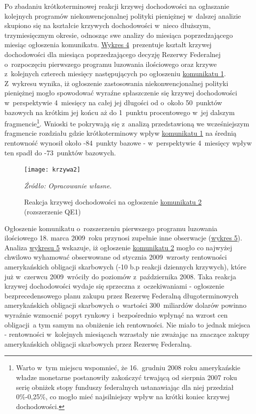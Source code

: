 Po zbadaniu krótkoterminowej reakcji krzywej dochodowości na ogłaszanie kolejnych programów niekonwencjonalnej polityki pieniężnej w~dalszej analizie skupiono się na kształcie krzywych dochodowości w~nieco dłuższym, trzymiesięcznym okresie, odnosząc swe analizy do miesiąca poprzedzającego miesiąc ogłoszenia komunikatu. \hyperlink{fig4}{Wykres 4}~prezentuje kształt krzywej dochodowości dla miesiąca poprzedzającego decyzję Rezerwy Federalnej o~rozpoczęciu pierwszego programu luzowania ilościowego oraz krzywe z~kolejnych czterech miesięcy następujących po ogłoszeniu \hyperlink{kom1}{komunikatu 1}. Z~wykresu wynika, iż ogłoszenie zastosowania niekonwencjonalnej polityki pieniężnej mogło spowodować wyraźne spłaszczenie się krzywej dochodowości w~perspektywie 4~miesięcy na całej jej długości od o~około 50~punktów bazowych na krótkim jej końcu aż do 1~punktu procentowego w~jej dalszym fragmencie\footnote{Warto w~tym miejscu wspomnieć, że 16.~grudniu 2008 roku amerykańskie władze monetarne postanowiły zakończyć trwającą od sierpnia 2007 roku serię obniżek stopy funduszy federalnych ustanawiając dla niej przedział 0\%-0,25\%, co mogło mieć najsilniejszy wpływ na krótki koniec krzywej dochodowości.}. Wnioski te pokrywają się z~analizą przedstawioną we wcześniejszym fragmencie rozdziału gdzie krótkoterminowy wpływ \hyperlink{kom1}{komunikatu 1} na średnią rentowność wynosił około -84~punkty bazowe - w~perspektywie 4~miesięcy wpływ ten spadł do -73~punktów bazowych.

\vspace{0.25cm}
\hypertarget{fig5}{}
\begin{figure}[h]
\begin{centering}
  \texttt{[image: krzywa2]}
    \captionsetup{format=hang}
    \caption{Reakcja krzywej dochodowości na ogłoszenie \protect\hyperlink{kom2}{komunikatu 2} (rozszerzenie QE1)}
\end{centering}
\begin{flushleft}
\hspace{1cm}\textit{\footnotesize{Źródło: Opracowanie własne.}} \\
\end{flushleft}
\vspace{-0.5cm}
\end{figure}

Ogłoszenie komunikatu o~rozszerzeniu pierwszego programu luzowania ilościowego 18. marca 2009~roku przynosi zupełnie inne obserwacje (\hyperlink{fig5}{wykres 5}). Analiza \hyperlink{fig5}{wykresu 5} wskazuje, iż ogłoszenie \hyperlink{kom2}{komunikatu 2} mogło co najwyżej chwilowo wyhamować obserwowane od stycznia 2009~wzrosty rentowności amerykańskich obligacji skarbowych (-10 b.p reakcji dziennych krzywych), które już w~czerwcu 2009~wróciły do poziomów z~października 2008. Taka reakcja krzywej dochodowości wydaje się sprzeczna z~oczekiwaniami - ogłoszenie bezprecedensowego planu zakupu przez Rezerwę Federalną długoterminowych amerykańskich obligacji skarbowych o~wartości 300~miliardów dolarów powinno wyraźnie wzmocnić popyt rynkowy i~bezpośrednio wpłynąć na wzrost cen obligacji~a tym samym na obniżenie ich rentowności. Nie miało to jednak miejsca - rentowności w~kolejnych miesiącach wzrastały nie zważając na znaczące zakupy amerykańskich obligacji skarbowych przez Rezerwę Federalną.

